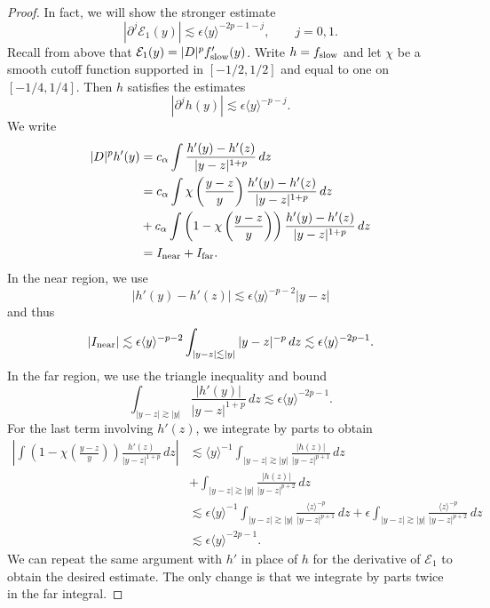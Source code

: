 \documentclass[11pt]{amsart}
\theoremstyle{definition}
\theoremstyle{remark}
\numberwithin{equation}{section}
\newcommand{\mc}[1]{\mathcal{#1}}
\newcommand{\ang}[1]{\langle #1 \rangle}
\begin{document}
\begin{proof}
    In fact, we will show the stronger estimate
    \begin{equation}\label{eqn:approx_E1_bound}
        |\partial^j \mc{E}_1(y)| \lesssim \epsilon \ang{y}^{-2p-1-j}, \qquad j=0,1.
    \end{equation}
    Recall from above that $\mc{E}_1(y) = |D|^p f_{\textup{slow}}'(y)$. Write $h = f_{\textup{slow}}$ and let $\chi$ be a smooth cutoff function supported in $[-1/2,1/2]$ and equal to one on $[-1/4,1/4]$. Then $h$ satisfies the estimates
    \[|\partial^j h(y)| \lesssim \epsilon \ang{y}^{-p  - j}.\]
    We write 
    \begin{align*}
        |D|^p h'(y) & = c_\alpha \int \frac{h'(y) - h'(z)}{|y - z|^{1 + p}} \, dz \\
        & = c_\alpha \int \chi\left(\frac{y - z}{y}\right) \frac{h'(y) - h'(z)}{|y - z|^{1 + p}} \, dz  \\
        & + c_\alpha \int \left(1 - \chi\left(\frac{y - z}{y}\right)\right) \frac{h'(y) - h'(z)}{|y - z|^{1 + p}} \, dz \\
        & = I_{\textup{near}} + I_{\textup{far}}.
    \end{align*}
    In the near region, we use 
    \[|h'(y) - h'(z)| \lesssim \epsilon \ang{y}^{-p-2}|y - z|\]
    and thus
    \[|I_{\textup{near}}| \lesssim \epsilon \ang{y}^{-p - 2} \int_{|y - z| \lesssim |y|} |y - z|^{- p} \, dz \lesssim \epsilon \ang{y}^{-2p - 1}.\]
    In the far region, we use the triangle inequality and bound
    \[\int_{|y - z| \gtrsim |y|} \frac{|h'(y)|}{|y - z|^{1 + p}} \, dz \lesssim \epsilon \ang{y}^{-2p - 1}.\]
    For the last term involving $h'(z)$, we integrate by parts to obtain 
    \begin{align*}
        \left|\int \left(1 - \chi\left(\frac{y - z}{y}\right)\right) \frac{h'(z)}{|y - z|^{1 + p}} \, dz\right| & \lesssim \ang{y}^{-1}\int_{|y - z| \gtrsim |y|} \frac{|h(z)|}{|y - z|^{p+1}} \, dz \\
        & + \int_{|y - z| \gtrsim |y|} \frac{|h(z)|}{|y - z|^{p + 2}} \, dz \\
        & \lesssim \epsilon\ang{y}^{-1}\int_{|y - z| \gtrsim |y|}\frac{\ang{z}^{-p}}{|y - z|^{p+1}} \, dz + \epsilon\int_{|y - z| \gtrsim |y|}\frac{\ang{z}^{-p}}{|y - z|^{p + 2}} \, dz \\
        & \lesssim \epsilon\ang{y}^{-2p - 1}.
    \end{align*}
    We can repeat the same argument with $h'$ in place of $h$ for the derivative of $\mc{E}_1$ to obtain the desired estimate. The only change is that we integrate by parts twice in the far integral.
\end{proof}
\end{document}

